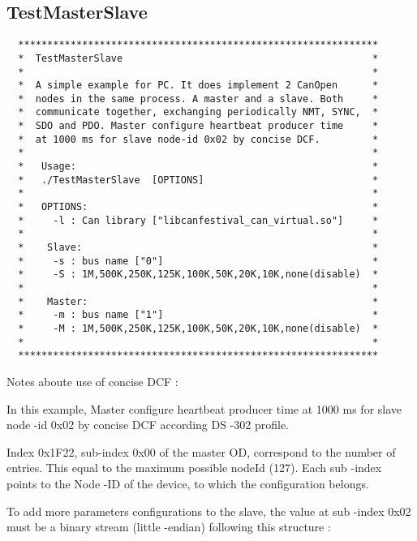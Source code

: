 \documentclass[12pt,english,a4paper]{book}
\begin{document}
\subsection{TestMasterSlave}


\begin{verbatim}
  **************************************************************
  *  TestMasterSlave                                           *
  *                                                            *
  *  A simple example for PC. It does implement 2 CanOpen      *
  *  nodes in the same process. A master and a slave. Both     *
  *  communicate together, exchanging periodically NMT, SYNC,  *
  *  SDO and PDO. Master configure heartbeat producer time     *
  *  at 1000 ms for slave node-id 0x02 by concise DCF.         *                                  
  *                                                            *
  *   Usage:                                                   *
  *   ./TestMasterSlave  [OPTIONS]                             *
  *                                                            *
  *   OPTIONS:                                                 *
  *     -l : Can library ["libcanfestival_can_virtual.so"]     *
  *                                                            *
  *    Slave:                                                  *
  *     -s : bus name ["0"]                                    *
  *     -S : 1M,500K,250K,125K,100K,50K,20K,10K,none(disable)  *
  *                                                            *
  *    Master:                                                 *
  *     -m : bus name ["1"]                                    *
  *     -M : 1M,500K,250K,125K,100K,50K,20K,10K,none(disable)  *
  *                                                            *
  **************************************************************
\end{verbatim}


Notes aboute use of concise DCF :

In this example, Master configure heartbeat producer time
at 1000 ms for slave node -id 0x02 by concise DCF according DS -302
profile.

Index 0x1F22, sub-index 0x00 of the master OD, correspond
to the number of entries. This equal to the maximum possible nodeId
(127). Each sub -index points to the Node -ID of the device, to which
the configuration belongs.

To add more parameters configurations to the slave, the value
at sub -index 0x02 must be a binary stream (little -endian) following
this structure :
\end{document}
